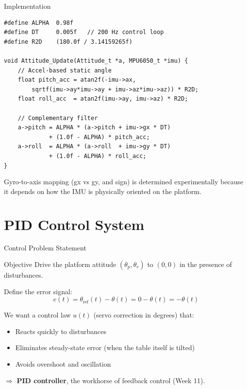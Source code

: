 \documentclass[10pt]{beamer}
\begin{document}
\begin{frame}[fragile]{Implementation}
\begin{lstlisting}
#define ALPHA  0.98f
#define DT     0.005f   // 200 Hz control loop
#define R2D    (180.0f / 3.14159265f)

void Attitude_Update(Attitude_t *a, MPU6050_t *imu) {
    // Accel-based static angle
    float pitch_acc = atan2f(-imu->ax,
        sqrtf(imu->ay*imu->ay + imu->az*imu->az)) * R2D;
    float roll_acc  = atan2f(imu->ay, imu->az) * R2D;

    // Complementary filter
    a->pitch = ALPHA * (a->pitch + imu->gx * DT)
             + (1.0f - ALPHA) * pitch_acc;
    a->roll  = ALPHA * (a->roll  + imu->gy * DT)
             + (1.0f - ALPHA) * roll_acc;
}
\end{lstlisting}

  \scriptsize
  Gyro-to-axis mapping (gx vs gy, and sign) is determined experimentally because it depends on how the IMU is physically oriented on the platform.
\end{frame}

\section{PID Control System}

\begin{frame}{Control Problem Statement}
  \begin{block}{Objective}
    Drive the platform attitude $(\theta_p, \theta_r)$ to $(0, 0)$ in the presence of disturbances.
  \end{block}

  Define the error signal:
  \[
    e(t) = \theta_{\text{ref}}(t) - \theta(t) = 0 - \theta(t) = -\theta(t)
  \]

  We want a control law $u(t)$ (servo correction in degrees) that:
  \begin{itemize}
    \item Reacts quickly to disturbances
    \item Eliminates steady-state error (when the table itself is tilted)
    \item Avoids overshoot and oscillation
  \end{itemize}

  $\Rightarrow$ \textbf{PID controller}, the workhorse of feedback control (Week 11).
\end{frame}
\end{document}
